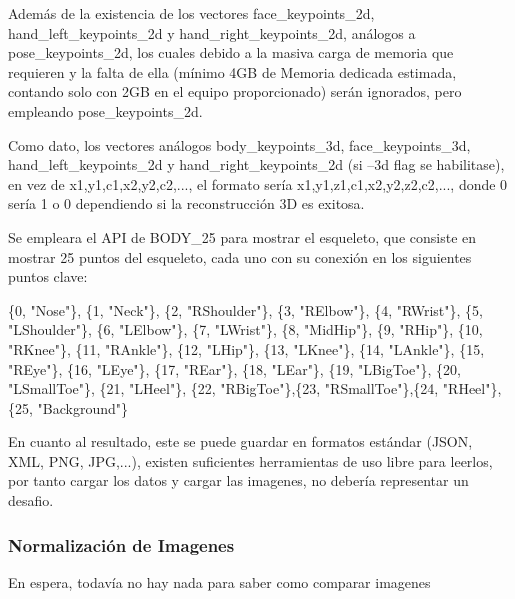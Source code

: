 Además de la existencia de los vectores face\_keypoints\_2d, hand\_left\_keypoints\_2d y hand\_right\_keypoints\_2d, análogos a pose\_keypoints\_2d, los cuales debido a la masiva carga de memoria que requieren y la falta de ella (mínimo 4GB de Memoria dedicada estimada, contando solo con 2GB en el equipo proporcionado) serán ignorados, pero empleando pose\_keypoints\_2d.

Como dato, los vectores análogos body\_keypoints\_3d, face\_keypoints\_3d,
hand\_left\_keypoints\_2d y hand\_right\_keypoints\_2d (si --3d flag se habilitase), en vez de 
x1,y1,c1,x2,y2,c2,..., el formato sería x1,y1,z1,c1,x2,y2,z2,c2,..., donde 0 sería 1 o 0 dependiendo si la reconstrucción 3D es exitosa.

Se empleara el API de BODY\_25 para mostrar el esqueleto, que consiste en mostrar 25 puntos del esqueleto, cada uno con su conexión en los siguientes puntos clave:

\{0,  "Nose"\}, \{1,  "Neck"\}, \{2,  "RShoulder"\}, \{3,  "RElbow"\}, \{4,  "RWrist"\}, 
\{5,  "LShoulder"\}, \{6,  "LElbow"\}, \{7,  "LWrist"\}, \{8,  "MidHip"\}, \{9,  "RHip"\},
\{10, "RKnee"\}, \{11, "RAnkle"\}, \{12, "LHip"\}, \{13, "LKnee"\}, \{14, "LAnkle"\}, 
\{15, "REye"\}, \{16, "LEye"\}, \{17, "REar"\}, \{18, "LEar"\}, \{19, "LBigToe"\},
\{20, "LSmallToe"\}, \{21, "LHeel"\}, \{22, "RBigToe"\},\{23, "RSmallToe"\},\{24, "RHeel"\},
\{25, "Background"\}


En cuanto al resultado, este se puede guardar en formatos estándar (JSON, XML, PNG, JPG,...), existen suficientes herramientas de uso libre para leerlos, por tanto cargar los datos y cargar las imagenes, no debería representar un desafio.



\subsubsection{Normalización de Imagenes}

En espera, todavía no hay nada para saber como comparar imagenes





